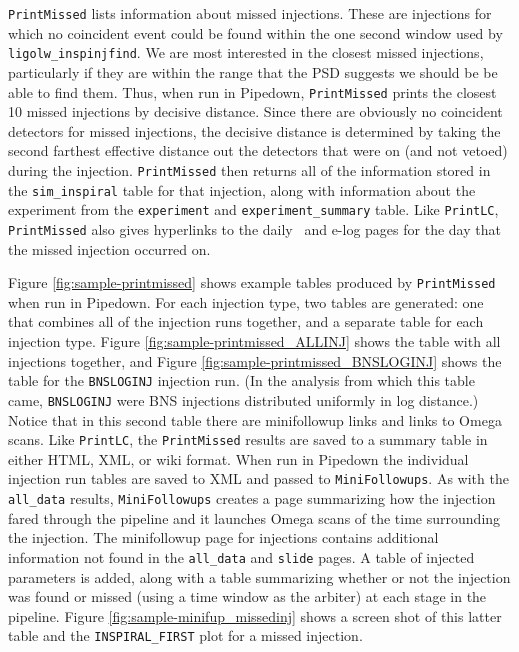 \texttt{PrintMissed} lists information about missed injections. These are injections for
which no coincident event could be found within the one second window used by
\verb|ligolw_inspinjfind|. We are most interested in the closest missed
injections, particularly if they are within the range that the \ac{PSD}
suggests we should be be able to find them. Thus, when run in Pipedown,
\texttt{PrintMissed} prints the closest 10 missed injections by decisive distance. Since
there are obviously no coincident detectors for missed injections, the
decisive distance is determined by taking the second farthest effective
distance out the detectors that were on (and not vetoed) during the injection.
\texttt{PrintMissed} then returns all of the information stored in the
\verb|sim_inspiral| table for that injection, along with information about the
experiment from the \verb|experiment| and \verb|experiment_summary| table. Like
\texttt{PrintLC}, \texttt{PrintMissed} also gives hyperlinks to the daily \ihope~and e-log pages
for the day that the missed injection occurred on. 

Figure \ref{fig:sample-printmissed} shows example tables produced by
\texttt{PrintMissed} when run in Pipedown. For each injection type, two tables are
generated: one that combines all of the injection runs together, and a separate
table for each injection type. Figure \ref{fig:sample-printmissed_ALLINJ} shows
the table with all injections together, and Figure
\ref{fig:sample-printmissed_BNSLOGINJ} shows the table for the \verb|BNSLOGINJ|
injection run. (In the analysis from which this table came, \texttt{BNSLOGINJ}
were \ac{BNS} injections distributed uniformly in log distance.) Notice that in
this second table there are minifollowup links and links to Omega scans. Like
\texttt{PrintLC}, the \texttt{PrintMissed} results are saved to a summary table in either HTML,
XML, or wiki format. When run in Pipedown the individual injection run tables
are saved to XML and passed to \texttt{MiniFollowups}. As with the \verb|all_data|
results, \texttt{MiniFollowups} creates a page summarizing how the injection fared
through the pipeline and it launches Omega scans of the time surrounding the
injection. The minifollowup page for injections contains additional information
not found in the \verb|all_data| and \verb|slide| pages. A table of injected
parameters is added, along with a table summarizing whether or not the
injection was found or missed (using a time window as the arbiter) at each
stage in the pipeline. Figure \ref{fig:sample-minifup_missedinj} shows a screen
shot of this latter table and the \verb|INSPIRAL_FIRST| plot for a missed
injection.

